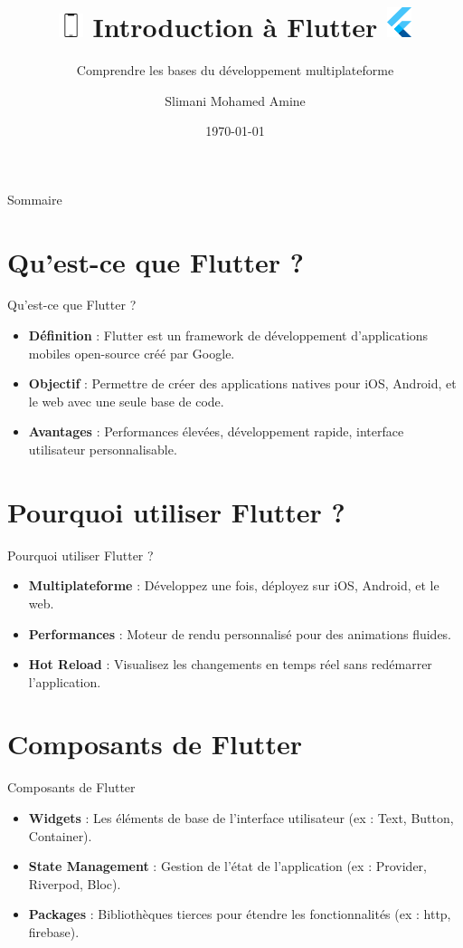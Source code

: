 \documentclass{clbeamer2024}
\title{
	\includegraphics[width=0.7cm]{logos/smartphone.png}
        Introduction à Flutter
	\includegraphics[width=0.7cm]{logos/flutter.png} \hfill
}
\subtitle{Comprendre les bases du développement multiplateforme}
\author{Slimani Mohamed Amine}
\institute{EHTP}
\date{\today}
\begin{document}
	\setcounter{framenumber}{-1}
	\frame{\titlepage}
	
	
	
	\begin{frame}{Sommaire}
		\tableofcontents
	\end{frame}
	
	
	\section{Qu'est-ce que Flutter ?}
	\begin{frame}{Qu'est-ce que Flutter ?}
		\begin{itemize}
			\item \textbf{Définition} : Flutter est un framework de développement d'applications mobiles open-source créé par Google.
			\item \textbf{Objectif} : Permettre de créer des applications natives pour iOS, Android, et le web avec une seule base de code.
			\item \textbf{Avantages} : Performances élevées, développement rapide, interface utilisateur personnalisable.
		\end{itemize}
	\end{frame}
	
	\section{Pourquoi utiliser Flutter ?}
	\begin{frame}{Pourquoi utiliser Flutter ?}
		\begin{itemize}
			\item \textbf{Multiplateforme} : Développez une fois, déployez sur iOS, Android, et le web.
			\item \textbf{Performances} : Moteur de rendu personnalisé pour des animations fluides.
			\item \textbf{Hot Reload} : Visualisez les changements en temps réel sans redémarrer l'application.
		\end{itemize}
	\end{frame}
	
	\section{Composants de Flutter}
	\begin{frame}{Composants de Flutter}
		\begin{itemize}
			\item \textbf{Widgets} : Les éléments de base de l'interface utilisateur (ex : Text, Button, Container).
			\item \textbf{State Management} : Gestion de l'état de l'application (ex : Provider, Riverpod, Bloc).
			\item \textbf{Packages} : Bibliothèques tierces pour étendre les fonctionnalités (ex : http, firebase).
		\end{itemize}
	\end{frame}
	
\end{document}
